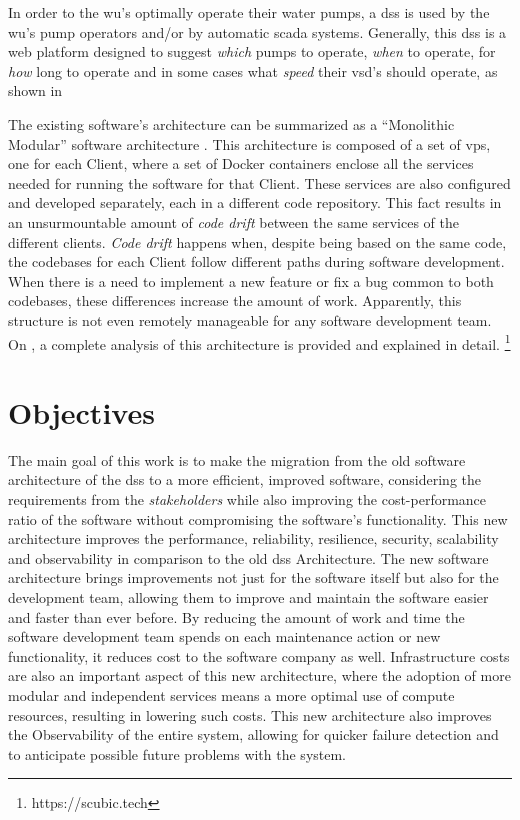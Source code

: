 In order to the \gls{wu}'s optimally operate their water pumps, a \gls{dss} is used by the \gls{wu}'s pump operators and/or by automatic \gls{scada} systems. Generally, this \gls{dss} is a web platform designed to suggest \textit{which} pumps to operate, \textit{when} to operate, for \textit{how} long to operate and in some cases what \textit{speed} their \gls{vsd}'s should operate, as shown in 

The existing software’s architecture can be summarized as a “Monolithic Modular” software architecture \parencite{newman2019monolith}. This architecture is composed of a set of \gls{vps}, one for each Client, where a set of Docker containers enclose all the services needed for running the software for that Client. These services are also configured and developed separately, each in a different code repository. This fact results in an unsurmountable amount of \textit{code drift} between the same services of the different clients. \textit{Code drift} happens when, despite being based on the same code, the codebases for each Client follow different paths during software development. When there is a need to implement a new feature or fix a bug common to both codebases, these differences increase the amount of work. Apparently, this structure is not even remotely manageable for any software development team. On , a complete analysis of this architecture is provided and explained in detail.
\footnote{https://scubic.tech\label{foot:scubic}}

\section{Objectives}\label{intro:s:objectives}

The main goal of this work is to make the migration from the old software architecture of the \gls{dss} to a more efficient, improved software, considering the requirements from the \textit{stakeholders} while also improving the cost-performance ratio of the software without compromising the software's functionality.
This new architecture improves the performance, reliability, resilience, security, scalability and observability in comparison to the old \gls{dss} Architecture. The new software architecture brings improvements not just for the software itself but also for the development team, allowing them to improve and maintain the software easier and faster than ever before. By reducing the amount of work and time the software development team spends on each maintenance action or new functionality, it reduces cost to the software company as well. Infrastructure costs are also an important aspect of this new architecture, where the adoption of more modular and independent services means a more optimal use of compute resources, resulting in lowering such costs. This new architecture also improves the Observability of the entire system, allowing for quicker failure detection and to anticipate possible future problems with the system.

